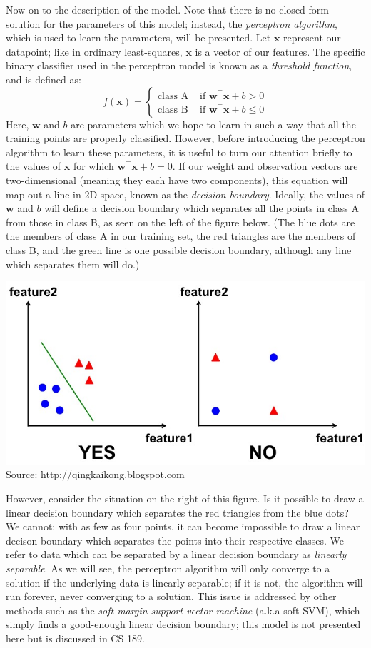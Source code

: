 \documentclass{article}
\begin{document}
\noindent Now on to the description of the model. Note that there is no closed-form solution for the parameters of this model; instead, the \textit{perceptron algorithm}, which is used to learn the parameters, will be presented. Let $\mathbf{x}$ represent our datapoint; like in ordinary least-squares, $\mathbf{x}$ is a vector of our features. The specific binary classifier used in the perceptron model is known as a \textit{threshold function}, and is defined as: $$f(\mathbf{x}) = \begin{cases} \text{class A} & \text{ if } \mathbf{w^{\top}}\mathbf{x} + b > 0 \\ \text{class B} & \text{ if } \mathbf{w^{\top}}\mathbf{x} + b \leq 0\end{cases}$$ Here, $\mathbf{w}$ and $b$ are parameters which we hope to learn in such a way that all the training points are properly classified. However, before introducing the perceptron algorithm to learn these parameters, it is useful to turn our attention briefly to the values of $\mathbf{x}$ for which $\mathbf{w^{\top}}\mathbf{x} + b = 0$. If our weight and observation vectors are two-dimensional (meaning they each have two components), this equation will map out a line in 2D space, known as the \textit{decision boundary}. Ideally, the values of $\mathbf{w}$ and $b$ will define a decision boundary which separates all the points in class A from those in class B, as seen on the left of the figure below. (The blue dots are the members of class A in our training set, the red triangles are the members of class B, and the green line is one possible decision boundary, although any line which separates them will do.)

\begin{center}
    \includegraphics[width=.6\textwidth]{figures/image1.jpg}\\
    Source: http://qingkaikong.blogspot.com
\end{center}

\noindent However, consider the situation on the right of this figure. Is it possible to draw a linear decision boundary which separates the red triangles from the blue dots? We cannot; with as few as four points, it can become impossible to draw a linear decison boundary which separates the points into their respective classes. We refer to data which can be separated by a linear decision boundary as \textit{linearly separable}. As we will see, the perceptron algorithm will only converge to a solution if the underlying data is linearly separable; if it is not, the algorithm will run forever, never converging to a solution. This issue is addressed by other methods such as the \textit{soft-margin support vector machine} (a.k.a soft SVM), which simply finds a good-enough linear decision boundary; this model is not presented here but is discussed in CS 189. \\
\end{document}
